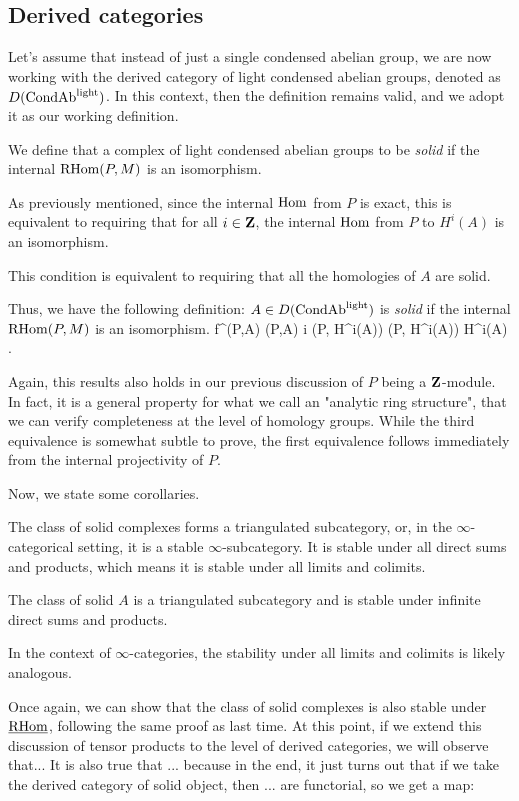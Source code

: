 \subsection{Derived categories}

Let's assume that instead of just a single condensed abelian group, we are now working with the derived category of light condensed abelian groups, denoted as $D(\mathrm{Cond}\mathrm{Ab}^{\mathrm{light}})$. In this context, then the definition remains valid, and we adopt it as our working definition.

We define that a complex of light condensed abelian groups to be \textit{solid} if the internal $\operatorname{RHom}(P,M)$ is an isomorphism. 

As previously mentioned, since the internal $\operatorname{Hom}$ from $P$ is exact, this is equivalent to requiring that for all $i \in \mathbf Z$, the internal $\operatorname{Hom}$ from $P$ to $H^i(A)$ is an isomorphism. 

This condition is equivalent to requiring that all the homologies of $A$ are solid.

Thus, we have the following definition:
\bd
$A \in D(\mathrm{Cond}\mathrm{Ab}^{\mathrm{light}})$ is \textit{solid} if the internal $\operatorname{RHom}(P,M)$ is an isomorphism.
\be
f^\ast \cl \IntRHom(P,A) \iso \IntRHom(P,A)
\ee
\be
\iff \forall i \in \Z \cl \IntHom(P, H^i(A)) \iso \IntHom(P, H^i(A))
\ee
\be
\iff {} H^i(A) .
\ee
\ed

Again, this results also holds in our previous discussion of $P$ being a $\mathbf Z$-module. In fact, it is a general property for what we call an "analytic ring structure", that we can verify completeness at the level of homology groups. While the third equivalence is somewhat  subtle to prove, the first equivalence follows immediately from the internal projectivity of $P$.

Now, we state some corollaries. 

The class of solid complexes forms a triangulated subcategory, or, in the $\infty$-categorical setting, it is a stable $\infty$-subcategory. It is stable under all direct sums and products, which means it is stable under all limits and colimits.

\bc
The class of solid $A$ is a triangulated subcategory and is stable under infinite direct sums and products.
\ec

In the context of $\infty$-categories, the stability under all limits and colimits is likely analogous.

Once again, we can show that the class of solid complexes is also stable under $\operatorname{\underline{RHom}}$, following the same proof as last time. 
At this point, if we extend this discussion of tensor products to the level of derived categories, we will observe that...
It is also true that ... because in the end, it just turns out that if we take the derived category of solid object, then ...  are functorial, so we get a map:

